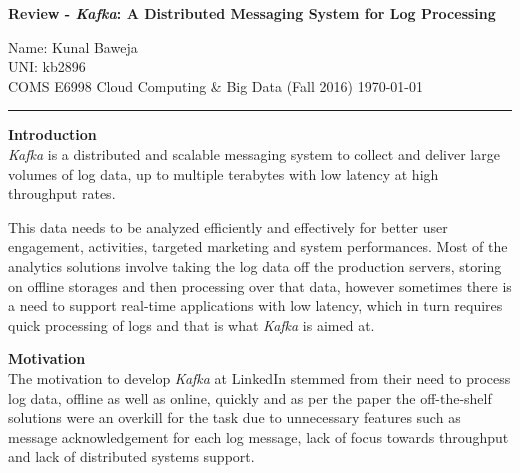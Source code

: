 \documentclass[12pt, a4paper]{article}
\def\name{Kunal Baweja}
\def\uni{kb2896}
\def\assignment{Review - \textit{Kafka}: A Distributed Messaging System for Log Processing}
\def\subject{COMS E6998 Cloud Computing \& Big Data (Fall 2016)}
\begin{document}
\begin{center}
    \textbf{\large \assignment}
    \vspace{0.1em}
\end{center}

Name: {\name}\\
UNI: {\uni}\\
{\subject} \hfill {\today}

\rule{\textwidth}{0.2pt}

\textbf{Introduction}\\
\textit{Kafka} is a distributed and scalable messaging system to collect and deliver large volumes of log data, up to multiple terabytes with low latency at high throughput rates.\par

This data needs to be analyzed efficiently and effectively for better user engagement, activities, targeted marketing and system performances. Most of the analytics solutions involve taking the log data off the production servers, storing on offline storages and then processing over that data, however sometimes there is a need to support real-time applications with low latency, which in turn requires quick processing of logs and that is what \textit{Kafka} is aimed at.\par

\textbf{Motivation}\\
The motivation to develop \textit{Kafka} at LinkedIn stemmed from their need to process log data, offline as well as online, quickly and as per the paper the off-the-shelf solutions were an overkill for the task due to unnecessary features such as message acknowledgement for each log message, lack of focus towards throughput and lack of distributed systems support.
\end{document}
